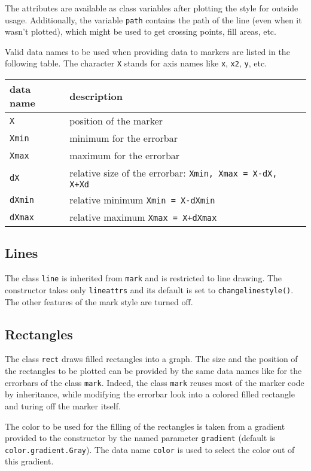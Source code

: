The attributes are available as class variables after plotting the
style for outside usage. Additionally, the variable \verb|path|
contains the path of the line (even when it wasn't plotted), which
might be used to get crossing points, fill areas, etc.

Valid data names to be used when providing data to markers are listed
in the following table. The character \verb|X| stands for axis names
like \verb|x|, \verb|x2|, \verb|y|, etc.

\begin{center}
\begin{tabular}{ll}
data name&description\\
\hline
\texttt{X}&position of the marker\\
\texttt{Xmin}&minimum for the errorbar\\
\texttt{Xmax}&maximum for the errorbar\\
\texttt{dX}&relative size of the errorbar: \texttt{Xmin, Xmax = X-dX, X+Xd}\\
\texttt{dXmin}&relative minimum \texttt{Xmin = X-dXmin}\\
\texttt{dXmax}&relative maximum \texttt{Xmax = X+dXmax}\\
\end{tabular}
\end{center}

\subsection{Lines}

The class \verb|line| is inherited from \verb|mark| and is restricted
to line drawing. The constructor takes only \verb|lineattrs| and its
default is set to \verb|changelinestyle()|. The other features of the
mark style are turned off.

\subsection{Rectangles}

The class \verb|rect| draws filled rectangles into a graph. The size
and the position of the rectangles to be plotted can be provided by
the same data names like for the errorbars of the class \verb|mark|.
Indeed, the class \verb|mark| reuses most of the marker code by
inheritance, while modifying the errorbar look into a colored filled
rectangle and turing off the marker itself.

The color to be used for the filling of the rectangles is taken from a
gradient provided to the constructor by the named parameter
\verb|gradient| (default is \verb|color.gradient.Gray|). The data
name \verb|color| is used to select the color out of this gradient.

